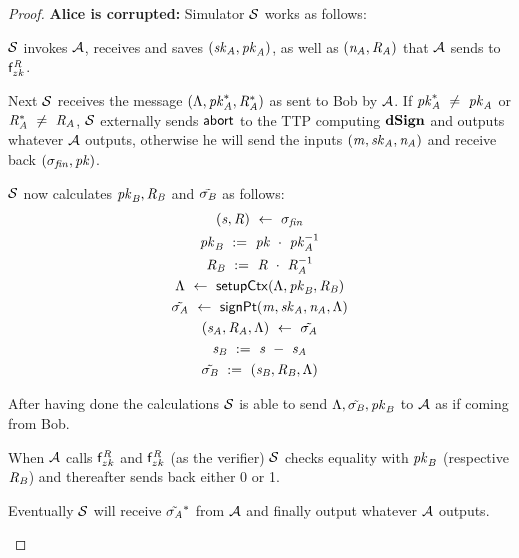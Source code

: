 \begin{proof}
    \textbf{Alice is corrupted: } Simulator $\mathcal{S}$ works as follows:
    \begin{asparaenum}
        \item $\mathcal{S}$ invokes $\mathcal{A}$, receives and saves $(\mathit{sk}_{\mathit{A}}, \mathit{pk}_{\mathit{A}})$, as well as $(\mathit{\mathit{n}_{\mathit{A}}}, \mathit{R}_{\mathit{A}})$ that $\mathcal{A}$ sends to $\mathsf{f}^{\mathit{R}}_{zk}$.
        \item Next $\mathcal{S}$ receives the message $(\Lambda, \mathit{pk}_{\mathit{A}}^*, \mathit{R}_{\mathit{A}}^*)$ as sent to Bob by $\mathcal{A}$.
        If $\mathit{pk}_{\mathit{A}}^* ~\neq~ \mathit{pk}_{\mathit{A}}$ or $\mathit{R}_{\mathit{A}}^* ~\neq~ \mathit{R}_{\mathit{A}}$, $\mathcal{S}$ externally sends $\mathsf{abort}$ to the TTP computing $\mathbf{dSign}$ and outputs whatever $\mathcal{A}$ outputs, otherwise he will send the inputs $(\mathit{m}, \mathit{sk}_{\mathit{A}}, \mathit{\mathit{n}_{\mathit{A}}})$ and receive back $(\sigma_{\mathit{fin}}, \mathit{pk})$.
        \item $\mathcal{S}$ now calculates $\mathit{pk}_{\mathit{B}}, \mathit{R}_{\mathit{B}}$ and $\tilde{\sigma_{\mathit{B}}}$ as follows:
        \begin{gather*}
            (\mathit{s}, \mathit{R}) ~\leftarrow~ \sigma_{\mathit{fin}} \\
            \mathit{pk}_{\mathit{B}} ~:=~ \mathit{pk} ~\cdot~ \mathit{pk}_{\mathit{A}}^{-1} \\
            \mathit{R}_{\mathit{B}} ~:=~ \mathit{R} ~\cdot~ \mathit{R}_{\mathit{A}}^{-1} \\
            \Lambda ~\leftarrow~ \mathsf{setupCtx}( \Lambda, \mathit{pk}_{\mathit{B}}, \mathit{R}_{\mathit{B}} ) \\
            \tilde{\sigma_{\mathit{A}}} ~\leftarrow~ \mathsf{signPt}(\mathit{m}, \mathit{sk}_{\mathit{A}}, \mathit{\mathit{n}_{\mathit{A}}}, \Lambda) \\
            (\mathit{s}_{\mathit{A}}, \mathit{R}_{\mathit{A}}, \Lambda) ~\leftarrow~ \tilde{\sigma_{\mathit{A}}} \\
            \mathit{s}_{\mathit{B}} ~:=~ \mathit{s} ~-~ \mathit{s}_{\mathit{A}} \\
            \tilde{\sigma_{\mathit{B}}} ~:=~ (\mathit{s}_{\mathit{B}}, \mathit{R}_{\mathit{B}}, \Lambda)
        \end{gather*}
        \item After having done the calculations $\mathcal{S}$ is able to send $\Lambda, \tilde{\sigma_{\mathit{B}}}, \mathit{pk}_{\mathit{B}}$ to $\mathcal{A}$ as if coming from Bob.
        \item When $\mathcal{A}$ calls $\mathsf{f}^{\mathit{R}}_{zk}$ and $\mathsf{f}^{\mathit{R}}_{zk}$ (as the verifier) $\mathcal{S}$ checks equality with $\mathit{pk}_{\mathit{B}}$ (respective $\mathit{R}_{\mathit{B}}$) and thereafter sends back either 0 or 1.
        \item Eventually $\mathcal{S}$ will receive $\tilde{\sigma_{\mathit{A}}}^*$ from $\mathcal{A}$ and finally output whatever $\mathcal{A}$ outputs.
    \end{asparaenum}


\end{proof}
